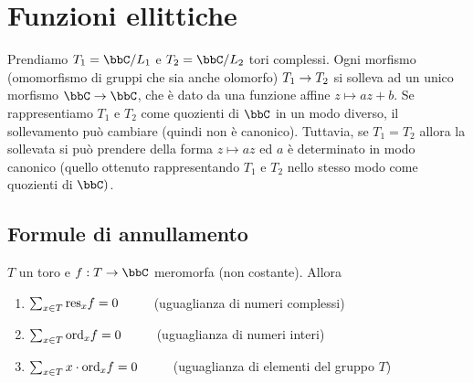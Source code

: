 \chapter{Funzioni ellittiche}

Prendiamo $T_1=\bbC/L_1$ e $T_2=\bbC/L_2$ tori complessi.
Ogni morfismo (omomorfismo di gruppi che sia anche olomorfo) $T_1\rightarrow T_2$ si solleva ad un unico morfismo $\bbC\rar\bbC$, che è dato da una funzione affine $z \mapsto az + b$.
Se rappresentiamo $T_1$ e $T_2$ come quozienti di $\bbC$ in un modo diverso, il sollevamento può cambiare (quindi non è canonico).
Tuttavia, se $T_1=T_2$ allora la sollevata si può prendere della forma $z \mapsto az$ ed $a$ è determinato in modo canonico (quello ottenuto rappresentando $T_1$ e $T_2$ nello stesso modo come quozienti di $\bbC)$.

\section{Formule di annullamento}

\begin{teorema}
  \label{residui-funzioni-toriche}
$T$ un toro e $f:T\rar\bbC$ meromorfa (non costante). Allora
\begin{enumerate}
    \item $\sum_{x\in T}\text{res}_xf=0$ $\qquad$ (uguaglianza di numeri complessi)

    \item $\sum_{x\in T}\text{ord}_xf=0$ $\qquad$ (uguaglianza di numeri interi)

    \item $\sum_{x\in T}x\cdot\text{ord}_xf=0$ $\qquad$ (uguaglianza di elementi del gruppo $T$)
\end{enumerate}

\end{teorema}



